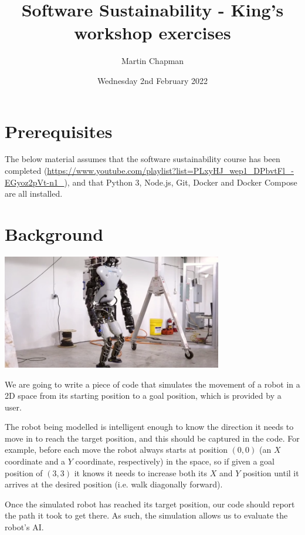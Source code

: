 \documentclass{article}
\title{Software Sustainability - King's workshop exercises}
\author{Martin Chapman}
\date{Wednesday 2nd February 2022}
\begin{document}

\maketitle

\section{Prerequisites}

The below material assumes that the software sustainability course has been completed (\href{https://www.youtube.com/playlist?list=PLxyHJ\_wep1\_DPbvtFl\_-EGyoz2pVt-n1\_}{https://www.youtube.com/playlist?list=PLxyHJ\_wep1\_DPbvtFl\_-EGyoz2pVt-n1\_}), and that Python 3, Node.js, Git, Docker and Docker Compose are all installed.

\section{Background}

\begin{center}
    \includegraphics[height=5cm]{robot.png}
\end{center}

We are going to write a piece of code that simulates the movement of a robot in a 2D space from its starting position to a goal position, which is provided by a user. 

The robot being modelled is intelligent enough to know the direction it needs to move in to reach the target position, and this should be captured in the code.
For example, before each move the robot always starts at position $(0, 0)$ (an $X$ coordinate and a $Y$ coordinate, respectively) in the space, so if given a goal position of $(3, 3)$ it knows it needs to increase both its $X$ and $Y$ position until it arrives at the desired position (i.e. walk diagonally forward).

Once the simulated robot has reached its target position, our code should report the path it took to get there.
As such, the simulation allows us to evaluate the robot's AI.
\end{document}
